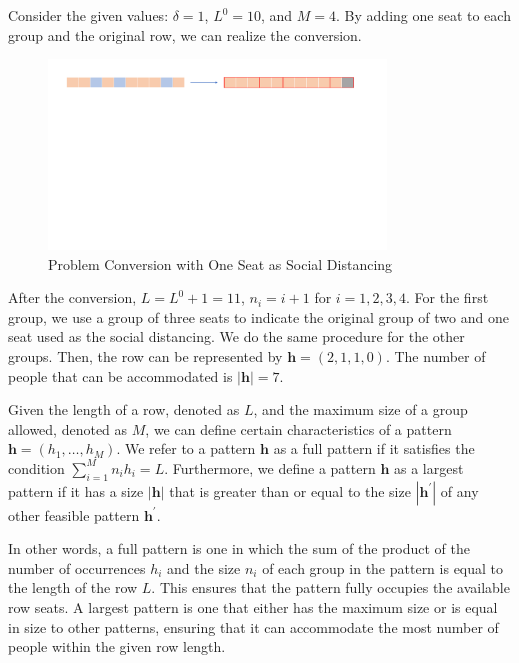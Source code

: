 \begin{example}
Consider the given values: $\delta = 1$, $L^{0} = 10$, and $M = 4$. By adding one seat to each group and the original row, we can realize the conversion.

\begin{figure}[ht]
    \centering
        \includegraphics[width=0.8\textwidth]{./Figures/dummy_seat.pdf}
    \caption{Problem Conversion with One Seat as Social Distancing}
\end{figure}

After the conversion, $L = L^{0} + 1 =11$, $n_i = i + 1$ for $i = 1, 2, 3, 4$. For the first group, we use a group of three seats to indicate the original group of two and one seat used as the social distancing. We do the same procedure for the other groups. Then, the row can be represented by $\bm{h} = (2,1,1,0)$. The number of people that can be accommodated is $|\bm{h}| = 7$.

\end{example}


\begin{definition}
Given the length of a row, denoted as $L$, and the maximum size of a group allowed, denoted as $M$, we can define certain characteristics of a pattern $\bm{h} = (h_1, \ldots, h_M)$.
We refer to a pattern $\bm{h}$ as a full pattern if it satisfies the condition $\sum_{i=1}^{M} n_i h_i = L$. Furthermore, we define a pattern $\bm{h}$ as a largest pattern if it has a size $|\bm{h}|$ that is greater than or equal to the size $|\bm{h}^{\prime}|$ of any other feasible pattern $\bm{h}^{\prime}$.
\end{definition}

In other words, a full pattern is one in which the sum of the product of the number of occurrences $h_i$ and the size $n_i$ of each group in the pattern is equal to the length of the row $L$. This ensures that the pattern fully occupies the available row seats. A largest pattern is one that either has the maximum size or is equal in size to other patterns, ensuring that it can accommodate the most number of people within the given row length.


